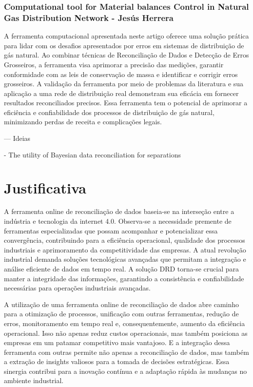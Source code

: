 \subsubsection{Computational  tool for Material balances Control in Natural Gas Distribution Network - Jesús Herrera}

A ferramenta computacional apresentada neste artigo oferece uma solução prática para lidar com os desafios apresentados por erros em sistemas de distribuição de gás natural. Ao combinar técnicas de Reconciliação de Dados e Detecção de Erros Grosseiros, a ferramenta visa aprimorar a precisão das medições, garantir conformidade com as leis de conservação de massa e identificar e corrigir erros grosseiros. A validação da ferramenta por meio de problemas da literatura e sua aplicação a uma rede de distribuição real demonstram sua eficácia em fornecer resultados reconciliados precisos. Essa ferramenta tem o potencial de aprimorar a eficiência e confiabilidade dos processos de distribuição de gás natural, minimizando perdas de receita e complicações legais.

--- Ideias 

- The utility of Bayesian data reconciliation for separations


\section{Justificativa}

A ferramenta online de reconciliação de dados baseia-se na interseção entre a indústria e tecnologia da internet 4.0. Observa-se a necessidade premente de ferramentas especializadas que possam acompanhar e potencializar essa convergência, contribuindo para a eficiência operacional, qualidade dos processos industriais e aprimoramento da competitividade das empresas. A atual revolução industrial demanda soluções tecnológicas avançadas que permitam a integração e análise eficiente de dados em tempo real. A solução DRD torna-se crucial para manter a integridade das informações, garantindo a consistência e confiabilidade necessárias para operações industriais avançadas.

A utilização de uma ferramenta online de reconciliação de dados abre caminho para a otimização de processos, unificação com outras ferramentas, redução de erros, monitoramento em tempo real e, consequentemente, aumento da eficiência operacional. Isso não apenas reduz custos operacionais, mas também posiciona as empresas em um patamar competitivo mais vantajoso. E a integração dessa ferramenta com outras permite não apenas a reconciliação de dados, mas também a extração de insights valiosos para a tomada de decisões estratégicas. Essa sinergia contribui para a inovação contínua e a adaptação rápida às mudanças no ambiente industrial.

